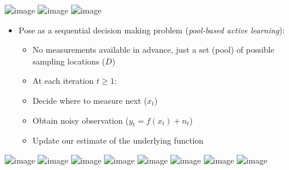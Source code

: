 \documentclass[10pt,mathserif]{beamer}
\begin{document}
\begin{frame}
\begin{center}
\vspace{0.2in}
\includegraphics<1>[width=4.7in]{figures/limno_bgape_sc}
\includegraphics<2>[width=4.7in]{figures/limno_bgape}
\includegraphics<3>[width=4.7in]{figures/limno_bgape_ls}
\end{center}
\end{frame}

\begin{frame}
\begin{itemize}
\item<1-> Pose as a sequential decision making problem (\emph{pool-based active learning}):
\begin{itemize}
\item<2-> No measurements available in advance, just a set (pool) of possible sampling locations ($D$)
\vspace{0.5em}
\item<3->[]\hspace{-1.5em} At each iteration $t \geq 1$:
\item<3-> Decide where to measure next ($x_t$)
\item<4-> Obtain noisy observation ($y_t = f(x_t) + n_t$)
\item<5-> Update our estimate of the underlying function
\end{itemize}
\end{itemize}
\begin{center}
\color{white}
\includegraphics<1>[draft,width=4.45in]{figures/oned_0}
\color{black}
\includegraphics<2>[width=4.45in]{figures/oned_0}
\includegraphics<3>[width=4.45in]{figures/oned_1_0}
\includegraphics<4>[width=4.45in]{figures/oned_1_1}
\includegraphics<5>[width=4.45in]{figures/oned_1_2}
\includegraphics<6>[width=4.45in]{figures/oned_2_0}
\includegraphics<7>[width=4.45in]{figures/oned_2_1}
\includegraphics<8>[width=4.45in]{figures/oned_2_2}
\end{center}
\end{frame}
\end{document}
